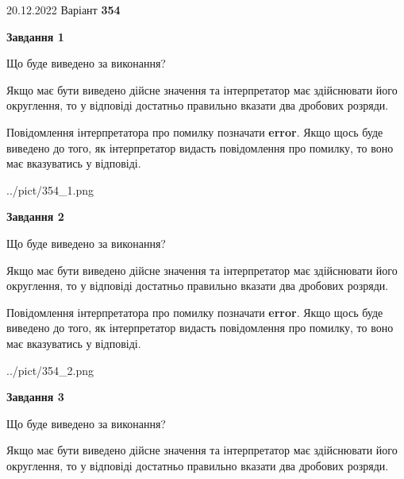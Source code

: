 \documentclass[12pt, ukrainian]{article}
\begin{document}
{20.12.2022 Варіант \No \textbf { 354 }\par}
{
\begin {Large}

{\begin {center}\textbf{Завдання 1}\end {center}}\par
Що буде виведено за виконання? \par

Якщо має бути виведено дійсне значення та інтерпретатор має здійснювати його округлення, 
то у відповіді достатньо правильно вказати два дробових розряди.

Повідомлення інтерпретатора про помилку позначати \textbf{error}.
Якщо щось буде виведено до того, як інтерпретатор видасть повідомлення про помилку, 
то воно має вказуватись у відповіді. \par

\begin{center}
	{../pict/354_1.png}
\end{center}
\newpage

{\begin {center}\textbf{Завдання 2}\end {center}}\par
Що буде виведено за виконання? \par

Якщо має бути виведено дійсне значення та інтерпретатор має здійснювати його округлення, 
то у відповіді достатньо правильно вказати два дробових розряди.

Повідомлення інтерпретатора про помилку позначати \textbf{error}.
Якщо щось буде виведено до того, як інтерпретатор видасть повідомлення про помилку, 
то воно має вказуватись у відповіді. \par

\begin{center}
	{../pict/354_2.png}
\end{center}
\newpage

{\begin {center}\textbf{Завдання 3}\end {center}}\par
Що буде виведено за виконання? \par

Якщо має бути виведено дійсне значення та інтерпретатор має здійснювати його округлення, 
то у відповіді достатньо правильно вказати два дробових розряди.


\end{Large}}
\end{document}
